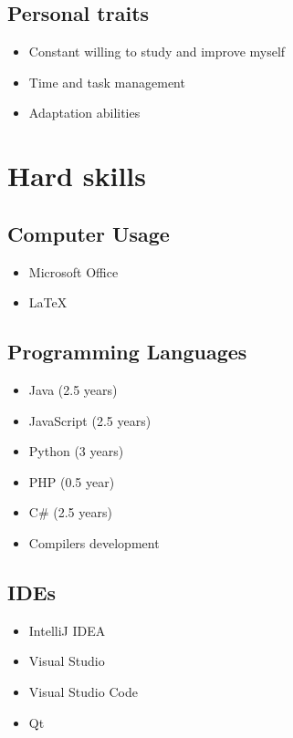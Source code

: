 \documentclass[a4paper,12pt]{article}
\begin{document}
\subsection*{Personal traits}

\begin{itemize}
    \item Constant willing to study and improve myself
    \item Time and task management
    \item Adaptation abilities
\end{itemize}

\newpage

\section*{Hard skills}

\subsection*{Computer Usage}

\begin{itemize}
    \item Microsoft Office
    \item LaTeX 
\end{itemize}

\smallskip

\subsection*{Programming Languages}

\begin{multicols}{2}
\begin{itemize}
    \item Java (2.5 years)
    \item JavaScript (2.5 years)
    \item Python (3 years)
    \item PHP (0.5 year)
    \item C\# (2.5 years)
    \item Compilers development
\end{itemize}
\end{multicols}

\subsection*{IDEs}

\begin{multicols}{2}
\begin{itemize}
    \item IntelliJ IDEA
    \item Visual Studio
    \item Visual Studio Code
    \item Qt
\end{itemize}
\end{multicols}
\end{document}

